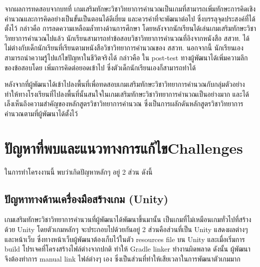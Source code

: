 จากผลการทดสอบจากบทที่  เกมเสริมทักษะวิชาวิทยาการคำนวณเป็นเกมที่สามารถเพิ่มทักษะการคิดเชิงคำนวณและการคิดอย่างเป็นขั้นเป็นตอนได้ดีเยี่ยม และควรค่าที่จะพัฒนาต่อไป
ซึ่งบรรลุจุดประสงค์ที่ได้ตั้งไว้ กล่าวคือ การลดความเหลือมล้ำทางด้านการศึกษา โดยหลังจากนักเรียนได้เล่นเกมเสริมทักษะวิชาวิทยาการคำนวณไปแล้ว นักเรียนสามารถทำข้อสอบวิชาวิทยาการคำนวณที่อิงจากหนังสือ สสวท. ได้ไม่ต่างกับเด็กนักเรียนที่เรียนตามหนังสือวิชาวิทยาการคำนวณของ สสวท. 
นอกจากนี้ นักเรียนเองสามารถนำความรู้ไปแก้ไขปัญหาในชีวิตจริงได้ กล่าวคือ ใน post-test ทางผู้พัฒนาได้เพิ่มความลึกของข้อสอบโดย
เพิ่มการคิดต่อยอดเข้าไป ซึ่งตัวเด็กนักเรียนเองก็สามารถทำได้ 

หลังจากที่ผู้พัฒนาได้เข้าไปลงพื้นที่เพื่อทดสอบเกมเสริมทักษะวิชาวิทยาการคำนวณกับกลุ่มตัวอย่าง ทำให้ทางโรงเรียนที่ไปลงพื้นที่นั้นสนใจในเกมเสริมทักษะวิชาวิทยาการคำนวณเป็นอย่างมาก และได้เล็งเห็นถึงความสำคัญของหลักสูตรวิชาวิทยาการคำนวณ ซึ่งเป็นการผลักดันหลักสูตรวิชาวิทยาการคำนวณตามที่ผู้พัฒนาได้ตั้งไว้


\section{\ifcpe ปัญหาที่พบและแนวทางการแก้ไข\else Challenges\fi}

ในการทำโครงงานนี้ พบว่าเกิดปัญหาหลักๆ อยู่ 2 ส่วน ดังนี้

\subsection{ปัญหาทางด้านเครื่องมือสร้างเกม (Unity)}
เกมเสริมทักษะวิชาวิทยาการคำนวนที่ผู้พัฒนาได้พัฒนาขึ้นมานั้น เป็นเกมที่ไม่เหมือนเกมทั่วไปที่สร้างด้วย
Unity โดยตัวเกมหลักๆ จะประกอบไปด้วยกันอยู่ 2 ส่วนคือส่วนที่เป็น Unity แสดงผลต่างๆ และหน้าเว็บ ซึ่งทางหน้าเว็บผู้พัฒนาต้องเก็บไว้ในตัว resources file
บน Unity และเมื่อเริ่มการ build โปรเจคที่โครงสร้างไฟล์ต่างจากปกติ ทำให้ Gradle linker ทำงานผิดพลาด ดังนั้น ผู้พัฒนาจึงต้องทำการ manual link ไฟล์ต่างๆ เอง
ซึ่งเป็นส่วนที่ทำให้เสียเวลาในการพัฒนาตัวเกมมาก

